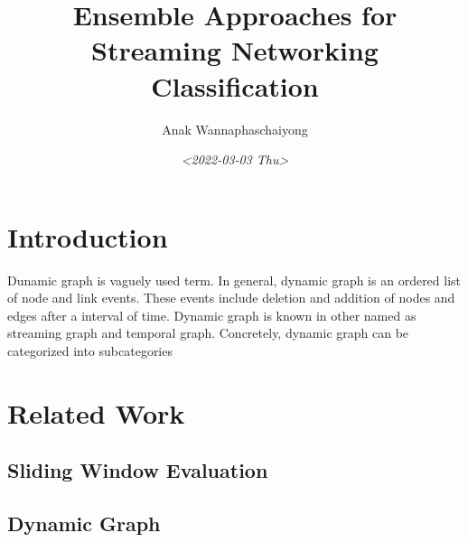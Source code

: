 \documentclass{IEEEtran}
\author{Anak Wannaphaschaiyong}
\date{\textit{<2022-03-03 Thu>}}
\title{Ensemble Approaches for Streaming Networking Classification}
\begin{document}
\maketitle

\section{Introduction}
\label{sec:org689b55d}
Dunamic graph is vaguely used term. In general, dynamic graph is an ordered list of node and link events. These events include deletion and addition of nodes and edges after a interval of time.
Dynamic graph is known in other named as streaming graph and temporal graph. Concretely, dynamic graph can be categorized into subcategories \cite{barrosSurveyEmbeddingDynamic2021,kazemiRepresentationLearningDynamica,skardingFoundationsModelingDynamic2021}

\section{Related Work}
\label{sec:org578a47b}
\subsection{Sliding Window Evaluation}
\label{sec:org9b01a27}
\subsection{Dynamic Graph}
\label{sec:orgb544e98}



\end{document}

